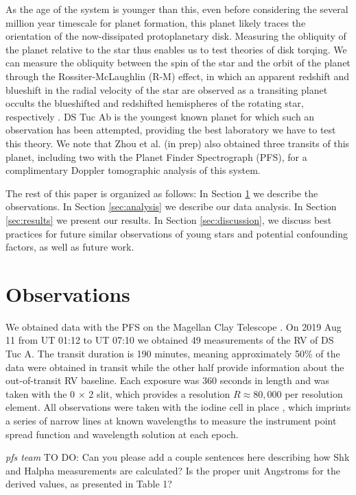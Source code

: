\documentclass[twocolumn]{aastex63}
\newcommand{\todo}[3]{{\color{#2} \emph{#1} TO DO: #3}}
\begin{document}
As the age of the system is younger than this, even before considering the several million year timescale for planet formation, this planet likely traces the orientation of the now-dissipated protoplanetary disk. 
Measuring the obliquity of the planet relative to the star thus enables us to test theories of disk torqing.
We can measure the obliquity between the spin of the star and the orbit of the planet through the Rossiter-McLaughlin (R-M) effect, in which an apparent redshift and blueshift in the radial velocity of the star are observed as a transiting planet occults the blueshifted and redshifted hemispheres of the rotating star, respectively \citep{Rossiter24, McLaughlin24}.
DS Tuc Ab is the youngest known planet for which such an observation has been attempted, providing the best laboratory we have to test this theory.
We note that Zhou et al. (in prep) also obtained three transits of this planet, including two with the Planet Finder Spectrograph (PFS), for a complimentary Doppler tomographic analysis of this system.


The rest of this paper is organized as follows:
In Section \ref{sec:obs} we describe the observations.
In Section \ref{sec:analysis} we describe our data analysis.
In Section \ref{sec:results} we present our results.
In Section \ref{sec:discussion}, we discuss best practices for future similar observations of young stars and potential confounding factors, as well as future work.


\section{Observations}
\label{sec:obs}

We obtained data with the PFS on the Magellan Clay Telescope \citep{Crane06, Crane08, Crane10}. 
On 2019 Aug 11 from UT 01:12 to UT 07:10 we obtained 49 measurements of the RV of DS Tuc A. 
The transit duration is 190 minutes, meaning approximately 50\% of the data were obtained in transit while the other half provide information about the out-of-transit RV baseline. Each exposure was 360 seconds in length and was taken with the 0 $\times$ 2 slit, which provides a resolution $R \approx 80,000$ per resolution element. All observations were taken with the iodine cell in place \citep{Marcy92}, which imprints a series of narrow lines at known wavelengths to measure the instrument point spread function and wavelength solution at each epoch.

\todo{pfs team}{red}{Can you please add a couple sentences here describing how Shk and Halpha measurements are calculated? Is the proper unit Angstroms for the derived values, as presented in Table 1?}
\end{document}
